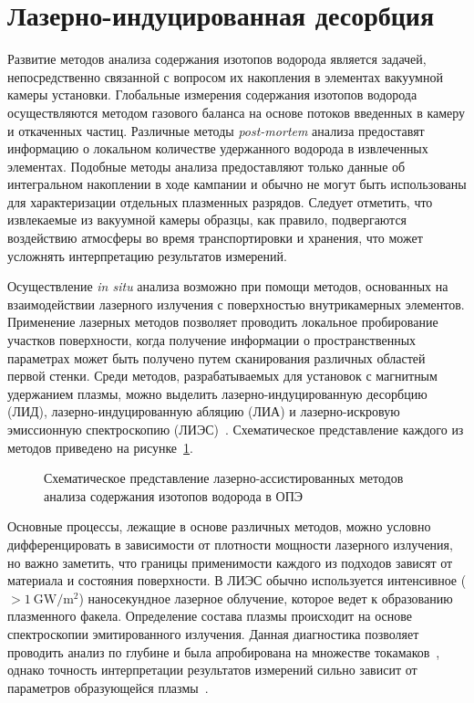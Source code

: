 \section{Лазерно-индуцированная десорбция}\label{sec:ch1/sec6}

Развитие методов анализа содержания изотопов водорода является задачей, непосредственно связанной с вопросом их накопления в элементах вакуумной камеры установки. Глобальные измерения содержания изотопов водорода осуществляются методом газового баланса на основе потоков введенных в камеру и откаченных частиц. Различные методы \textit{post-mortem} анализа предоставят информацию о локальном количестве удержанного водорода в извлеченных элементах. Подобные методы анализа предоставляют только данные об интегральном накоплении в ходе кампании и обычно не могут быть использованы для характеризации отдельных плазменных разрядов. Следует отметить, что извлекаемые из вакуумной камеры образцы, как правило, подвергаются воздействию атмосферы во время транспортировки и хранения, что может усложнять интерпретацию результатов измерений.

Осуществление \textit{in situ} анализа возможно при помощи методов, основанных на взаимодействии лазерного излучения с поверхностью внутрикамерных элементов. Применение лазерных методов позволяет проводить локальное пробирование участков поверхности, когда получение информации о пространственных параметрах может быть получено путем сканирования различных областей первой стенки. Среди методов, разрабатываемых для установок с магнитным удержанием плазмы, можно выделить лазерно-индуцированную десорбцию (ЛИД), лазерно-индуцированную абляцию (ЛИА) и лазерно-искровую эмиссионную спектроскопию (ЛИЭС)~\cite{Philipps2013,Mukhin2016}. Схематическое представление каждого из методов приведено на рисунке~\cref{fig:ch1/laser_methods}.

\begin{figure}[ht]
    \caption{Схематическое представление лазерно-ассистированных методов анализа содержания изотопов водорода в ОПЭ}\label{fig:ch1/laser_methods}
\end{figure}

Основные процессы, лежащие в основе различных методов, можно условно дифференцировать в зависимости от плотности мощности лазерного излучения, но важно заметить, что границы применимости каждого из подходов зависят от материала и состояния поверхности. В ЛИЭС обычно используется интенсивное (\( >\SI{1}{\giga\watt\per\meter\squared} \)) наносекундное лазерное облучение, которое ведет к образованию плазменного факела. Определение состава плазмы происходит на основе спектроскопии эмитированного излучения. Данная диагностика позволяет проводить анализ по глубине и была апробирована на множестве токамаков~\cite{Xiao2015,Semerok2016,Imran2023,Favre2024}, однако точность интерпретации результатов измерений сильно зависит от параметров образующейся плазмы~\cite{Marenkov2021}. 

